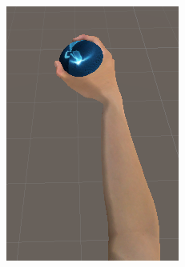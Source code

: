 \documentclass{ltjsreport}
\begin{document}
\begin{figure}[H]
\begin{minipage}{0.4\columnwidth}
		\includegraphics[width = \columnwidth]{../figs/grapsphere_up.png}
		\end{minipage}
		\caption{}
		\end{figure}
\end{document}
